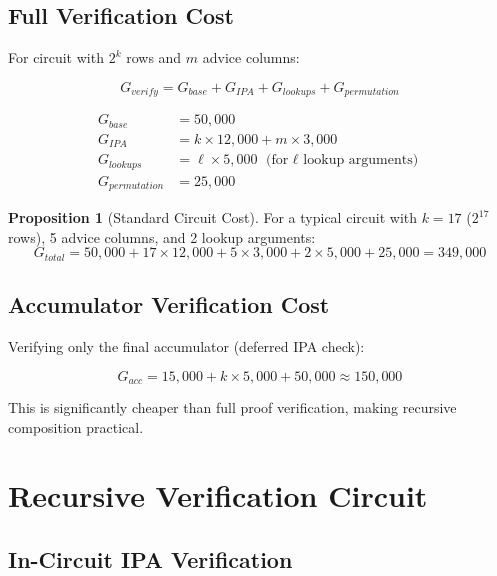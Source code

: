 \documentclass[11pt,a4paper]{article}
\theoremstyle{definition}
\newtheorem{proposition}{Proposition}
\begin{document}
\subsection{Full Verification Cost}

For circuit with $2^k$ rows and $m$ advice columns:

\begin{equation}
G_{verify} = G_{base} + G_{IPA} + G_{lookups} + G_{permutation}
\end{equation}

\begin{align}
G_{base} &= 50,000 \\
G_{IPA} &= k \times 12,000 + m \times 3,000 \\
G_{lookups} &= \ell \times 5,000 \text{ (for $\ell$ lookup arguments)} \\
G_{permutation} &= 25,000
\end{align}

\begin{proposition}[Standard Circuit Cost]
    For a typical circuit with $k=17$ ($2^{17}$ rows), 5 advice columns, and 2 lookup arguments:
    \[
    G_{total} = 50,000 + 17 \times 12,000 + 5 \times 3,000 + 2 \times 5,000 + 25,000 = 349,000
    \]
\end{proposition}

\subsection{Accumulator Verification Cost}

Verifying only the final accumulator (deferred IPA check):

\begin{equation}
G_{acc} = 15,000 + k \times 5,000 + 50,000 \approx 150,000
\end{equation}

This is significantly cheaper than full proof verification, making recursive composition practical.

\section{Recursive Verification Circuit}

\subsection{In-Circuit IPA Verification}
\end{document}
